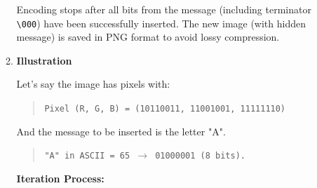 \documentclass{ittelkom}
\begin{document}
\begin{enumerate}
\begin{enumerate}
                    Encoding stops after all bits from the message (including terminator
                    \texttt{\textbackslash 000}) have been successfully inserted. The new image
                    (with hidden message) is saved in PNG format to avoid lossy compression.
              \item \textbf{Illustration}

                    Let's say the image has pixels with:

                    \begin{quote}
                        \texttt{Pixel (R, G, B) = (10110011, 11001001, 11111110)}
                    \end{quote}

                    And the message to be inserted is the letter "A".

                    \begin{quote}
                        \texttt{"A" in ASCII = 65 $\rightarrow$ 01000001 (8 bits).}
                    \end{quote}

                    \textbf{Iteration Process:}


\end{enumerate}
\end{enumerate}
\end{document}
